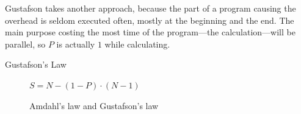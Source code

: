 Gustafson takes another approach, because the part of a program causing the overhead is seldom executed often, mostly at the beginning and the end. The main purpose costing the most time of the program---the calculation---will be parallel, so $P$ is actually $1$ while calculating.
%
\begin{description}
\item[Gustafson's Law] $S = N - (1-P) \cdot (N - 1)$
\end{description}
%
%
\begin{figure}[ht]
	\centering
	\hfill %
	\caption{Amdahl's law and Gustafson's law}
	\label{fig:amdahl}
\end{figure}
